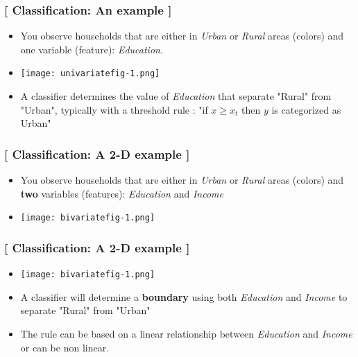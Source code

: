 \documentclass[xcolor=x11names,compress, handhouts]{beamer}
\renewcommand{\(}{\begin{columns}}
\renewcommand{\)}{\end{columns}}
\newcommand{\<}[1]{\begin{column}{#1}}
\renewcommand{\>}{\end{column}}
\begin{document}
\begin{frame} %
\frametitle{\textcolor{brique}{[ Classification:  An example ]}}
\pause
\begin{itemize}[<+->]
  \item You observe households that are either in \textit{Urban} or \textit{Rural} areas (colors) and one variable (feature): \textit{Education}.
  \item[] \begin{center}\texttt{[image: univariatefig-1.png]} \end{center}
  \item A classifier determines the value of\textit{ Education} that separate "Rural" from  "Urban", typically
 with a threshold rule : "if $x \geq x_t$  then $y$ is categorized as Urban"
\end{itemize}
\end{frame}



\begin{frame} %
\frametitle{\textcolor{brique}{[ Classification:  A 2-D example ]}}
\pause
\begin{itemize}[<+->]
  \item You observe households that are either in \textit{Urban} or \textit{Rural} areas (colors) and \textbf{two} variables (features): \textit{Education} and \textit{Income}
  \item[] \begin{center}\texttt{[image: bivariatefig-1.png]} \end{center}
\end{itemize}
\end{frame}




\begin{frame} %
\frametitle{\textcolor{brique}{[ Classification:  A 2-D example ]}}
\pause
\begin{itemize}[<+->]
  \item[] \begin{center}\texttt{[image: bivariatefig-1.png]} \end{center}
   \item A classifier will determine a\textbf{ boundary} using both \textit{Education}  and \textit{Income} to separate "Rural" from "Urban"
  \item The rule can be based on a linear relationship between \textit{Education}  and \textit{Income} or can be non linear.
\end{itemize}
\end{frame}
\end{document}
